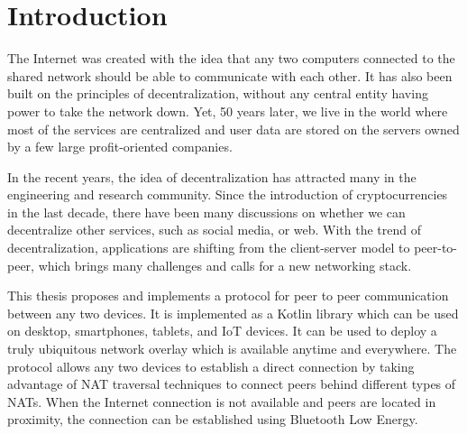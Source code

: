 \chapter{Introduction}


The Internet was created with the idea that any two computers connected to the shared network should be able to communicate with each other. It has also been built on the principles of decentralization, without any central entity having power to take the network down. Yet, 50 years later, we live in the world where most of the services are centralized and user data are stored on the servers owned by a few large profit-oriented companies.

In the recent years, the idea of decentralization has attracted many in the engineering and research community. Since the introduction of cryptocurrencies in the last decade, there have been many discussions on whether we can decentralize other services, such as social media, or web. With the trend of decentralization, applications are shifting from the client-server model to peer-to-peer, which brings many challenges and calls for a new networking stack.


This thesis proposes and implements a protocol for peer to peer communication between any two devices. It is implemented as a Kotlin library which can be used on desktop, smartphones, tablets, and IoT devices. It can be used to deploy a truly ubiquitous network overlay which is available anytime and everywhere. The protocol allows any two devices to establish a direct connection by taking advantage of NAT traversal techniques to connect peers behind different types of NATs. When the Internet connection is not available and peers are located in proximity, the connection can be established using Bluetooth Low Energy.

